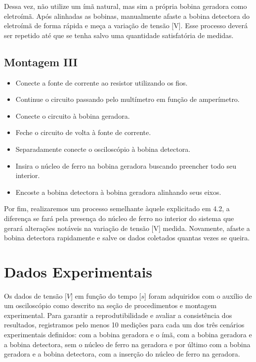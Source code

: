 \documentclass[column,brazilian,12pt,a4paper,final]{article}
\begin{document}
Dessa vez, não utilize um ímã natural, mas sim a própria bobina geradora como eletroímã. Após alinhadas as bobinas, manualmente afaste a bobina detectora do eletroímã de forma rápida e meça  a variação de tensão [V]. Esse processo deverá ser repetido até que se tenha salvo uma quantidade satisfatória de medidas.

\subsection{Montagem III}

\begin{itemize}
\item Conecte a fonte de corrente ao resistor utilizando os fios.\\

\item Continue o circuito passando pelo multímetro em função de amperímetro.\\

\item Conecte o circuito à bobina geradora.\\

\item Feche o circuito de volta à fonte de corrente.\\

\item Separadamente conecte o osciloscópio à bobina detectora.\\ 

\item Insira o núcleo de ferro na bobina geradora buscando preencher todo seu interior.\\

\item Encoste a bobina detectora à bobina geradora alinhando seus eixos.\\
\end{itemize}

Por fim, realizaremos um processo semelhante àquele explicitado em 4.2, a diferença se fará pela presença do núcleo de ferro no interior do sistema que gerará alterações notáveis na variação de tensão [V] medida. Novamente, afaste a bobina detectora rapidamente e salve os dados coletados quantas vezes se queira.

\section{Dados Experimentais}
\paragraph{}
Os dados de tensão [$V$] em função do tempo [$s$] foram adquiridos com o auxílio de um osciloscópio como descrito na seção de procedimentos e montagem experimental. Para garantir a reprodutibilidade e avaliar a consistência dos resultados, registramos pelo menos 10 medições para cada um dos três cenários experimentais definidos: com a bobina geradora e o ímã, com a bobina geradora e a bobina detectora, sem o núcleo de ferro na geradora e por último com a bobina geradora e a bobina detectora, com a inserção do núcleo de ferro na geradora.
\end{document}

